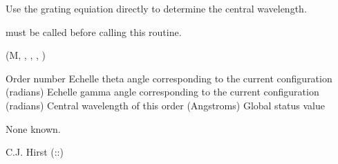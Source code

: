 \begin{manroutinedescription}
     Use the grating equiation directly to determine the central wavelength.

     {} must be called before calling this routine.

     {} {} (M, {}, {%
}, {}, {})

\begin{manparametertable}
 Order %
number
Echelle theta angle corresponding to the
                                      current configuration (radians)
Echelle gamma angle corresponding to the
                                      current configuration (radians)
Central wavelength of this order
                                      (Angstroms)
 Global status value
\end{manparametertable}
     None known.

     C.J. Hirst  {}  ({}::{})

\end{manroutinedescription}
